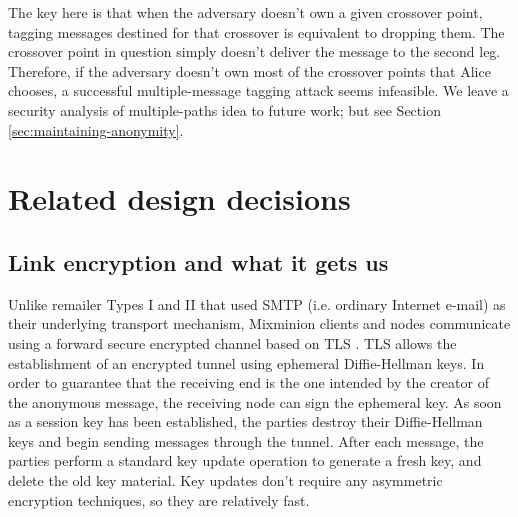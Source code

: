 \documentclass{llncs}
\begin{document}

The key here is that when the adversary doesn't own a given crossover
point, tagging messages destined for that crossover is equivalent to
dropping them.  The crossover point in question simply doesn't deliver
the message to the second leg. Therefore, if the adversary doesn't own
most of the crossover points that Alice chooses, a successful
multiple-message tagging attack seems infeasible.  We leave a security
analysis of multiple-paths idea to future work; but see
Section \ref{sec:maintaining-anonymity}.

\section{Related design decisions}


\subsection{Link encryption and what it gets us}
\label{subsec:link-encrypt}

Unlike remailer Types I and II that used SMTP \cite{SMTP} (i.e. ordinary
Internet e-mail) as their underlying transport mechanism, Mixminion
clients and nodes communicate using a forward secure encrypted channel
based on TLS \cite{TLS}.  
TLS allows the establishment of an encrypted tunnel using ephemeral
Diffie-Hellman keys. In order to guarantee that the receiving end is
the one intended by the creator of the anonymous message, the
receiving node can sign the ephemeral key. As soon as a session key
has been established, the parties destroy their Diffie-Hellman keys
and begin sending messages through the tunnel. After each message, the
parties perform a standard key update operation to generate a fresh
key, and delete the old key material.  Key updates don't require any
asymmetric encryption techniques, so they are relatively fast.

%
\end{document}
